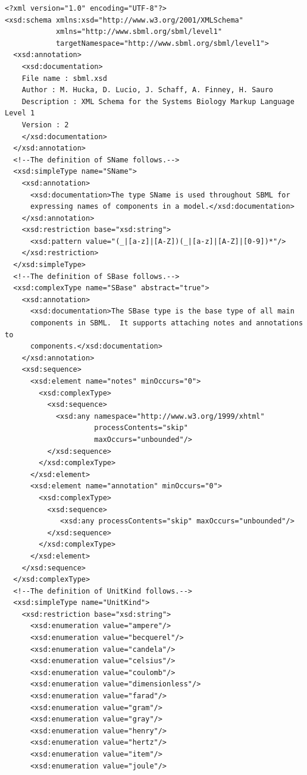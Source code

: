 \documentclass[10pt]{cekarticle}
\begin{document}
\begin{small}
\tightspacing
\begin{verbatim}
<?xml version="1.0" encoding="UTF-8"?>
<xsd:schema xmlns:xsd="http://www.w3.org/2001/XMLSchema" 
            xmlns="http://www.sbml.org/sbml/level1" 
            targetNamespace="http://www.sbml.org/sbml/level1">
  <xsd:annotation>
    <xsd:documentation>
    File name : sbml.xsd
    Author : M. Hucka, D. Lucio, J. Schaff, A. Finney, H. Sauro
    Description : XML Schema for the Systems Biology Markup Language Level 1
    Version : 2
    </xsd:documentation>
  </xsd:annotation>
  <!--The definition of SName follows.-->
  <xsd:simpleType name="SName">
    <xsd:annotation>
      <xsd:documentation>The type SName is used throughout SBML for
      expressing names of components in a model.</xsd:documentation>
    </xsd:annotation>
    <xsd:restriction base="xsd:string">
      <xsd:pattern value="(_|[a-z]|[A-Z])(_|[a-z]|[A-Z]|[0-9])*"/>
    </xsd:restriction>
  </xsd:simpleType>
  <!--The definition of SBase follows.-->
  <xsd:complexType name="SBase" abstract="true">
    <xsd:annotation>
      <xsd:documentation>The SBase type is the base type of all main 
      components in SBML.  It supports attaching notes and annotations to
      components.</xsd:documentation>
    </xsd:annotation>
    <xsd:sequence>
      <xsd:element name="notes" minOccurs="0">
        <xsd:complexType>
          <xsd:sequence>
            <xsd:any namespace="http://www.w3.org/1999/xhtml" 
                     processContents="skip" 
                     maxOccurs="unbounded"/>
          </xsd:sequence>
        </xsd:complexType>
      </xsd:element>
      <xsd:element name="annotation" minOccurs="0">
        <xsd:complexType>
          <xsd:sequence>
             <xsd:any processContents="skip" maxOccurs="unbounded"/>
          </xsd:sequence>
        </xsd:complexType>
      </xsd:element>
    </xsd:sequence>
  </xsd:complexType>
  <!--The definition of UnitKind follows.-->
  <xsd:simpleType name="UnitKind">
    <xsd:restriction base="xsd:string">
      <xsd:enumeration value="ampere"/>
      <xsd:enumeration value="becquerel"/>
      <xsd:enumeration value="candela"/>
      <xsd:enumeration value="celsius"/>
      <xsd:enumeration value="coulomb"/>
      <xsd:enumeration value="dimensionless"/>
      <xsd:enumeration value="farad"/>
      <xsd:enumeration value="gram"/>
      <xsd:enumeration value="gray"/>
      <xsd:enumeration value="henry"/>
      <xsd:enumeration value="hertz"/>
      <xsd:enumeration value="item"/>
      <xsd:enumeration value="joule"/>

\end{verbatim}
\end{small}
\end{document}
